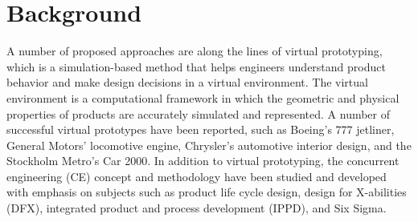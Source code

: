 \section{Background}

A number of proposed approaches are along the lines of virtual prototyping,  which
is  a  simulation-based  method  that  helps  engineers
understand product behavior and make design decisions in a virtual environment.
The virtual environment is a computational framework in which the geometric and
physical properties of products are accurately simulated and represented. A number
of successful virtual prototypes have  been  reported, such as  Boeing's 777 jetliner,
General Motors' locomotive engine, Chrysler's automotive interior design,
and the Stockholm Metro's Car 2000. In addition to virtual prototyping,
the concurrent engineering (CE) concept and methodology have been studied
and developed with emphasis on subjects such as product life cycle design,
design for X-abilities (DFX), integrated product and process development (IPPD), and Six Sigma.
